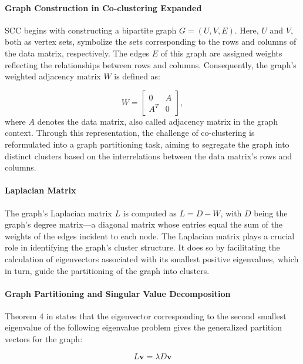 \paragraph{Graph Construction in Co-clustering Expanded}

SCC begins with constructing a bipartite graph $G=(U,V,E)$. Here, $U$ and $V$, both as vertex sets, symbolize the sets corresponding to the rows and columns of the data matrix, respectively. The edges $E$ of this graph are assigned weights reflecting the relationships between rows and columns. Consequently, the graph's weighted adjacency matrix $W$ is defined as:

$$ W = \begin{bmatrix} 0 & A \\ A^T & 0 \end{bmatrix}, $$
where $A$ denotes the data matrix, also called adjacency matrix in the graph context.
Through this representation, the challenge of co-clustering is reformulated into a graph partitioning task, aiming to segregate the graph into distinct clusters based on the interrelations between the data matrix's rows and columns.

\paragraph{Laplacian Matrix}

The graph's Laplacian matrix $L$ is computed as $L=D-W$, with $D$ being the graph's degree matrix—a diagonal matrix whose entries equal the sum of the weights of the edges incident to each node. The Laplacian matrix plays a crucial role in identifying the graph's cluster structure. It does so by facilitating the calculation of eigenvectors associated with its smallest positive eigenvalues, which in turn, guide the partitioning of the graph into clusters.

\paragraph{Graph Partitioning and Singular Value Decomposition}
Theorem 4 in \cite{dhillon2001CoclusteringDocumentsWords} states that the eigenvector corresponding to the second smallest eigenvalue of the following eigenvalue problem gives the generalized partition vectors for the graph:

\begin{equation}
    L \mathbf{v} = \lambda D \mathbf{v}
    \label{eq:eigenvalue_problem}
\end{equation}

